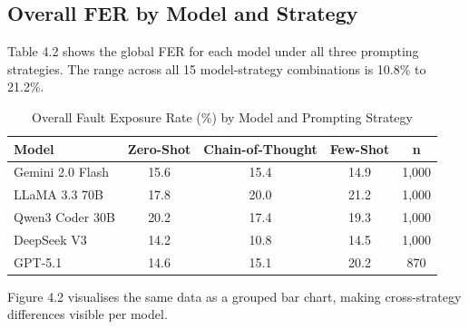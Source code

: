 \subsection{Overall FER by Model and Strategy}

Table 4.2 shows the global FER for each model under all three prompting strategies. The range across all 15 model-strategy combinations is 10.8\% to 21.2\%.

\begin{table}[h!]
    \centering
    \caption{Overall Fault Exposure Rate (\%) by Model and Prompting Strategy}
    \label{tab:overall_fer}
    \begin{tabular}{lcccc}
        \toprule
        \textbf{Model} & \textbf{Zero-Shot} & \textbf{Chain-of-Thought} & \textbf{Few-Shot} & \textbf{n} \\
        \midrule
        Gemini 2.0 Flash   & 15.6 & 15.4 & 14.9 & 1,000 \\
        LLaMA 3.3 70B      & 17.8 & 20.0 & 21.2 & 1,000 \\
        Qwen3 Coder 30B    & 20.2 & 17.4 & 19.3 & 1,000 \\
        DeepSeek V3        & 14.2 & 10.8 & 14.5 & 1,000 \\
        GPT-5.1            & 14.6 & 15.1 & 20.2 &   870 \\
        \bottomrule
    \end{tabular}
\end{table}

Figure 4.2 visualises the same data as a grouped bar chart, making cross-strategy differences visible per model.

